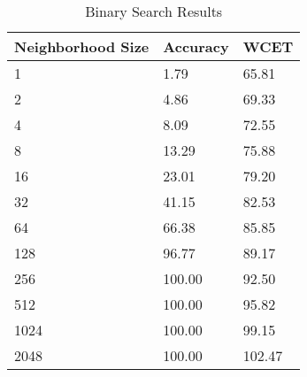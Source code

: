 \begin{table}[]
  \centering
  \caption{Binary Search Results}
  \label{bsearchT}
  \begin{tabular}{|l|l|l|}
    \hline
    \textbf{Neighborhood Size} & \textbf{Accuracy}     & \textbf{WCET}           \\ \hline
1 &  1.79
&65.81   \\ \hline
2 &  4.86
&69.33   \\ \hline
4 &  8.09
&72.55   \\ \hline
8 &  13.29
&75.88   \\ \hline
16 &  23.01
&79.20   \\ \hline
32 &  41.15
&82.53   \\ \hline
64 &  66.38
&85.85   \\ \hline
128 &  96.77
&89.17   \\ \hline
256 &  100.00
&92.50   \\ \hline
512 &  100.00
&95.82   \\ \hline
1024 &  100.00
&99.15   \\ \hline
2048 &  100.00
&102.47   \\ \hline
  \end{tabular}
\end{table}
